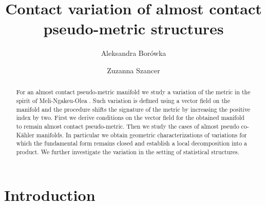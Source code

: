 \documentclass[12pt,a4paper,final]{amsart}
\numberwithin{equation}{section}
\theoremstyle{df}
\begin{document}
\baselineskip=17pt
\title{Contact variation of almost contact pseudo-metric structures}
\author[A. Bor\'owka]{Aleksandra Bor\'owka}
\address{Aleksandra Bor\'owka, Institute of Mathematics, Jagiellonian University in Krak\'ow, Poland}
\author[Z. Szancer]{Zuzanna Szancer}\address{Zuzanna Szancer, Department of Applied Mathematics, University of Agriculture in Krakow, 253 Balicka St., 30-198 Krakow, Poland}



\begin{abstract}
For an almost contact pseudo-metric manifold we study a variation of the metric in the spirit of Meli-Ngakeu-Olea \cite{MNO}. Such variation is defined using a vector field on the manifold and the procedure shifts the signature of the metric by increasing the positive index by two. First we derive conditions on the vector field for the obtained manifold to remain almost contact pseudo-metric. Then we study the cases of almost pseudo co-K\"ahler  manifolds. In particular we obtain geometric characterizations of variations for which the fundamental form remains closed and establish a local decomposition into a product. We further investigate the variation in the setting of statistical structures.
\end{abstract}

\maketitle

\section{Introduction}
\end{document}
